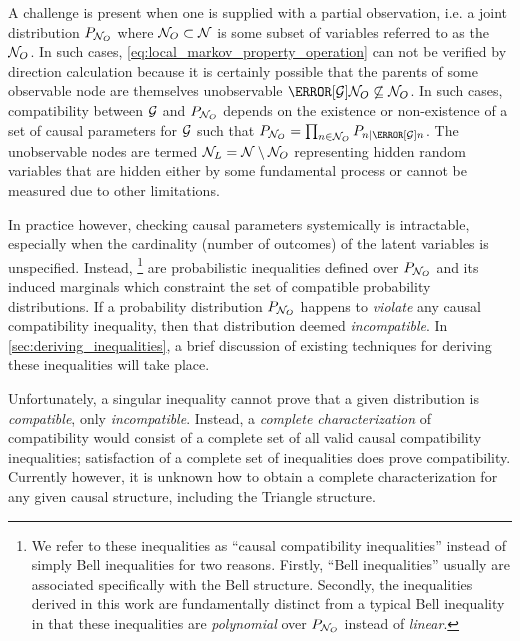 \documentclass[aps, 10pt, english, twoside, pra, nofootinbib, tightenlines, longbibliography, superscriptaddress]{revtex4-1}
\begin{document}
    A challenge is present when one is supplied with a partial observation, i.e. a joint distribution $\prob[\nodes_{O}]$ where $\mathcal{N}_{O} \subset \mathcal{N}$ is some subset of variables referred to as the  $\mathcal{N}_O$. In such cases, \cref{eq:local_markov_property_operation} can not be verified by direction calculation because it is certainly possible that the parents of some observable node are themselves unobservable $\Pa[\graph]{\nodes_{O}} \not \subseteq \nodes_{O}$. In such cases, compatibility between $\mathcal{G}$ and $\prob[\nodes_{O}]$ depends on the existence or non-existence of a set of causal parameters for $\mathcal{G}$ such that $\prob[\nodes_{O}] = \prod_{n \in \nodes_{O}} \prob[n \mid \Pa[\graph]{n}]$. The unobservable nodes are termed  $\mathcal{N}_L = \mathcal{N} \setminus \mathcal{N}_{O}$ representing hidden random variables that are hidden either by some fundamental process or cannot be measured due to other limitations.

    In practice however, checking causal parameters systemically is intractable, especially when the cardinality (number of outcomes) of the latent variables is unspecified. Instead, \footnote{We refer to these inequalities as ``causal compatibility inequalities'' instead of simply Bell inequalities for two reasons. Firstly, ``Bell inequalities'' usually are associated specifically with the Bell structure. Secondly, the inequalities derived in this work are fundamentally distinct from a typical Bell inequality in that these inequalities are \textit{polynomial} over $\prob[\nodes_{O}]$ instead of \textit{linear}.} are probabilistic inequalities defined over $\prob[\nodes_{O}]$ and its induced marginals which constraint the set of compatible probability distributions. If a probability distribution $\prob[\nodes_{O}]$ happens to \textit{violate} any causal compatibility inequality, then that distribution deemed \textit{incompatible}. In \cref{sec:deriving_inequalities}, a brief discussion of existing techniques for deriving these inequalities will take place.

    Unfortunately, a singular inequality cannot prove that a given distribution is \textit{compatible}, only \textit{incompatible}. Instead, a \textit{complete characterization} of compatibility would consist of a complete set of all valid causal compatibility inequalities; satisfaction of a complete set of inequalities does prove compatibility. Currently however, it is unknown how to obtain a complete characterization for any given causal structure, including the Triangle structure.
\end{document}

